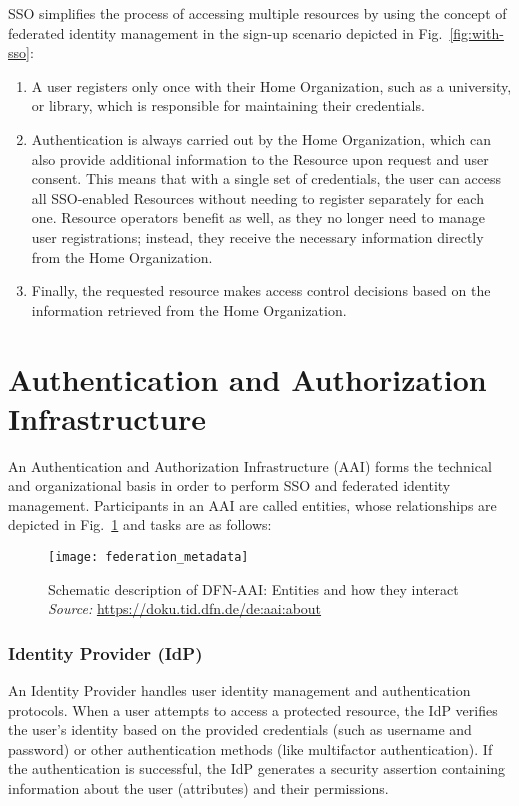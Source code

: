 SSO simplifies the process of accessing multiple resources by using the concept
of federated identity management in the sign-up scenario depicted in
Fig.~\ref{fig:with-sso}:
 
\begin{enumerate}
\item A user registers only once with their Home Organization, such as a
university, or library, which is responsible for maintaining their credentials.

\item Authentication is always carried out by the Home Organization, which can
also provide additional information to the Resource upon request and user
consent. This means that with a single set of credentials, the user can access
all SSO-enabled Resources without needing to register separately for each one.
Resource operators benefit as well, as they no longer need to manage user
registrations; instead, they receive the necessary information directly from the
Home Organization. 

\item Finally, the requested resource makes access control decisions based on
the information retrieved from the Home Organization.
\end{enumerate}

\section{Authentication and Authorization Infrastructure}

An Authentication and Authorization Infrastructure (AAI) forms the technical and
organizational basis in order to perform SSO and federated identity management.
Participants in an AAI are called entities, whose relationships are depicted in
Fig.~\ref{fig:federation} and tasks are as follows:

\begin{figure}[htb]
    \centering
    \texttt{[image: federation\_metadata]}
    \caption{Schematic description of DFN-AAI: Entities and how they interact \\
    \textit{Source:} \url{https://doku.tid.dfn.de/de:aai:about}}
    \label{fig:federation}
  \end{figure}

\subsubsection*{Identity Provider (IdP)}
An Identity Provider handles user identity management and authentication
protocols. When a user attempts to access a protected resource, the IdP verifies
the user's identity based on the provided credentials (such as username and
password) or other authentication methods (like multifactor authentication). If
the authentication is successful, the IdP generates a security assertion
containing information about the user (attributes) and their permissions.

